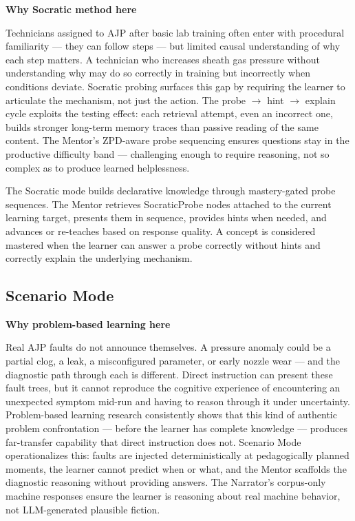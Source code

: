 \documentclass[10pt,letterpaper,twocolumn]{article}
\newenvironment{rationale}[1]{%
  \par\medskip\noindent
  \begin{lrbox}{\rationalebox}%
  \begin{minipage}{\dimexpr\linewidth-2\fboxsep-2\fboxrule\relax}
  \textbf{\sffamily\color{tmink}#1}\par\smallskip
}{%
  \end{minipage}%
  \end{lrbox}%
  \fcolorbox{tmaccent!55}{tmaccent!6}{\usebox{\rationalebox}}%
  \par\medskip
}
\newcommand{\arrowto}{$\rightarrow$}
\begin{document}
\begin{rationale}{Why Socratic method here}
Technicians assigned to AJP after basic lab training often enter with procedural familiarity --- they can follow steps --- but limited causal understanding of why each step matters. A technician who increases sheath gas pressure without understanding why may do so correctly in training but incorrectly when conditions deviate. Socratic probing surfaces this gap by requiring the learner to articulate the mechanism, not just the action. The probe \arrowto{} hint \arrowto{} explain cycle exploits the testing effect: each retrieval attempt, even an incorrect one, builds stronger long-term memory traces than passive reading of the same content. The Mentor's ZPD-aware probe sequencing ensures questions stay in the productive difficulty band --- challenging enough to require reasoning, not so complex as to produce learned helplessness.
\end{rationale}

The Socratic mode builds declarative knowledge through mastery-gated probe sequences. The Mentor retrieves SocraticProbe nodes attached to the current learning target, presents them in sequence, provides hints when needed, and advances or re-teaches based on response quality. A concept is considered mastered when the learner can answer a probe correctly without hints and correctly explain the underlying mechanism.

\subsection{Scenario Mode}
\label{sec:scenario-mode}

\begin{rationale}{Why problem-based learning here}
Real AJP faults do not announce themselves. A pressure anomaly could be a partial clog, a leak, a misconfigured parameter, or early nozzle wear --- and the diagnostic path through each is different. Direct instruction can present these fault trees, but it cannot reproduce the cognitive experience of encountering an unexpected symptom mid-run and having to reason through it under uncertainty. Problem-based learning research consistently shows that this kind of authentic problem confrontation --- before the learner has complete knowledge --- produces far-transfer capability that direct instruction does not. Scenario Mode operationalizes this: faults are injected deterministically at pedagogically planned moments, the learner cannot predict when or what, and the Mentor scaffolds the diagnostic reasoning without providing answers. The Narrator's corpus-only machine responses ensure the learner is reasoning about real machine behavior, not LLM-generated plausible fiction.
\end{rationale}
\end{document}
